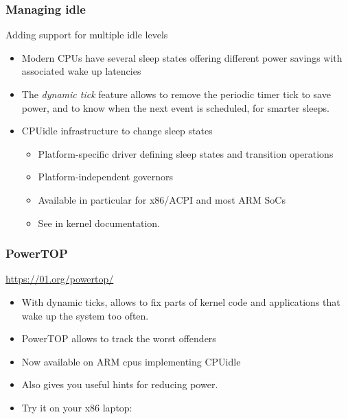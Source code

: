 \begin{frame}
  \frametitle{Managing idle}
  Adding support for multiple idle levels
  \begin{itemize}
  \item Modern CPUs have several sleep states offering different
    power savings with associated wake up latencies
  \item The {\em dynamic tick} feature allows to remove the
    periodic timer tick to save power, and to know when the next event is
    scheduled, for smarter sleeps.
  \item CPUidle infrastructure to change sleep states
    \begin{itemize}
    \item Platform-specific driver defining sleep states and
      transition operations
    \item Platform-independent governors
    \item Available in particular for x86/ACPI and most ARM SoCs
    \item See  in kernel documentation.
    \end{itemize}
  \end{itemize}
\end{frame}

\begin{frame}
  \frametitle{PowerTOP}
  \url{https://01.org/powertop/}
  \begin{itemize}
  \item With dynamic ticks, allows to fix parts of kernel code and
    applications that wake up the system too often.
  \item PowerTOP allows to track the worst offenders
  \item Now available on ARM cpus implementing CPUidle
  \item Also gives you useful hints for reducing power.
  \item Try it on your x86 laptop:\\
  \end{itemize}
\end{frame}

